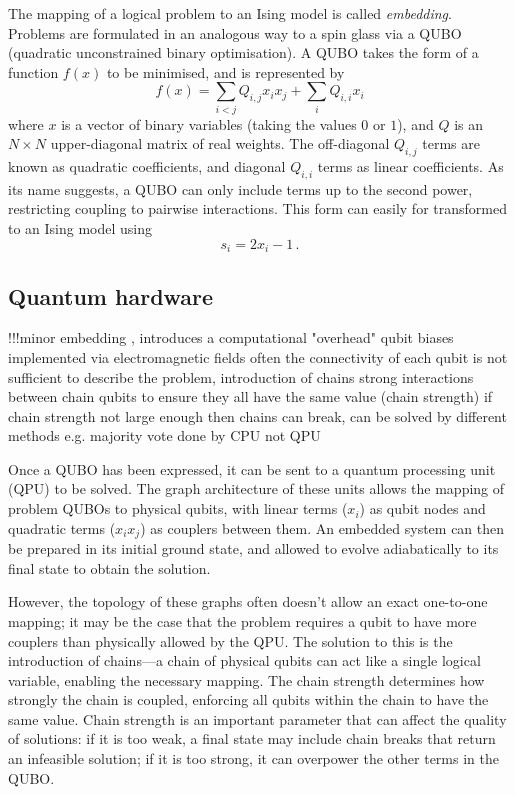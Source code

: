 \documentclass[12pt]{article}
\theoremstyle{definition}
\begin{document}
The mapping of a logical problem to an Ising model is called \textit{embedding}. Problems are formulated in an analogous way to a spin glass via a QUBO (quadratic unconstrained binary optimisation). A QUBO takes the form of a function $f(x)$ to be minimised, and is represented by
\begin{equation}
    f(x)=\sum_{i<j}Q_{i,j}x_ix_j + \sum_iQ_{i,i}x_i
    \label{eq:QUBO}
\end{equation}
where $x$ is a vector of binary variables (taking the values $0$ or $1$), and $Q$ is an $N\times N$ upper-diagonal matrix of real weights. The off-diagonal $Q_{i,j}$ terms are known as quadratic coefficients, and diagonal $Q_{i,i}$ terms as linear coefficients. As its name suggests, a QUBO can only include terms up to the second power, restricting coupling to pairwise interactions.
This form can easily for transformed to an Ising model using
\begin{equation}
    s_i = 2x_i - 1 \,.
    \label{eq:qubo-ising}
\end{equation}

\subsection{Quantum hardware}

!!!minor embedding , introduces a computational "overhead"
qubit biases implemented via electromagnetic fields
often the connectivity of each qubit is not sufficient to describe the problem, introduction of chains
strong interactions between chain qubits to ensure they all have the same value (chain strength)
if chain strength not large enough then chains can break, can be solved by different methods e.g. majority vote
done by CPU not QPU

Once a QUBO has been expressed, it can be sent to a quantum processing unit (QPU) to be solved. The graph architecture of these units allows the mapping of problem QUBOs to physical qubits, with linear terms ($x_i$) as qubit nodes and quadratic terms ($x_ix_j$) as couplers between them. An embedded system can then be prepared in its initial ground state, and allowed to evolve adiabatically to its final state to obtain the solution.

However, the topology of these graphs often doesn't allow an exact one-to-one mapping; it may be the case that the problem requires a qubit to have more couplers than physically allowed by the QPU. The solution to this is the introduction of chains—a chain of physical qubits can act like a single logical variable, enabling the necessary mapping. The chain strength determines how strongly the chain is coupled, enforcing all qubits within the chain to have the same value. Chain strength is an important parameter that can affect the quality of solutions: if it is too weak, a final state may include chain breaks that return an infeasible solution; if it is too strong, it can overpower the other terms in the QUBO.
\end{document}

